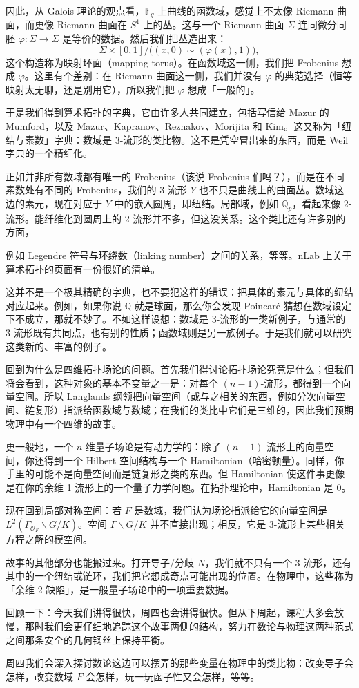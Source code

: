 因此，从 Galois 理论的观点看，$\mathbb{F}_q$ 上曲线的函数域，感觉上不太像 Riemann 曲面，而更像 Riemann 曲面在 $S^1$ 上的丛。这与一个 Riemann 曲面 $\Sigma$ 连同微分同胚 $\varphi:\Sigma\to\Sigma$ 是等价的数据。然后我们把丛造出来：
\[
\Sigma\times[0,1]\big/\big((x,0)\sim(\varphi(x),1)\big),
\]
这个构造称为映射环面（mapping torus）。在函数域这一侧，我们把 Frobenius 想成 $\varphi$。这里有个差别：在 Riemann 曲面这一侧，我们并没有 $\varphi$ 的典范选择（恒等映射太无聊，还是别用它），所以我们把 $\varphi$ 想成「一般的」。

于是我们得到算术拓扑的字典，它由许多人共同建立，包括写信给 Mazur 的 Mumford，以及 Mazur、Kapranov、Reznakov、Morijita 和 Kim。这又称为「纽结与素数」字典：数域是 3-流形的类比物。这不是凭空冒出来的东西，而是 Weil 字典的一个精细化。

正如并非所有数域都有唯一的 Frobenius（该说 Frobenius 们吗？），而是在不同素数处有不同的 Frobenius，我们的 3-流形 $Y$ 也不只是曲线上的曲面丛。数域这边的素元，现在对应于 $Y$ 中的嵌入圆周，即纽结。局部域，例如 $\mathbb{Q}_p$，看起来像 2-流形。能纤维化到圆周上的 2-流形并不多，但这没关系。这个类比还有许多别的方面，


例如 Legendre 符号与环绕数（linking number）之间的关系，等等。nLab 上关于算术拓扑的页面有一份很好的清单。

这并不是一个极其精确的字典，也不要犯这样的错误：把具体的素元与具体的纽结对应起来。例如，如果你说 $\mathbb{Q}$ 就是球面，那么你会发现 Poincaré 猜想在数域设定下不成立，那就不妙了。不如这样设想：数域是 3-流形的一类新例子，与通常的 3-流形既有共同点，也有别的性质；函数域则是另一族例子。于是我们就可以研究这类新的、丰富的例子。

回到为什么是四维拓扑场论的问题。首先我们得讨论拓扑场论究竟是什么；但我们将会看到，这种对象的基本不变量之一是：对每个 $(n-1)$-流形，都得到一个向量空间。所以 Langlands 纲领把向量空间（或与之相关的东西，例如分次向量空间、链复形）指派给函数域与数域；在我们的类比中它们是三维的，因此我们预期物理中有一个四维的故事。

更一般地，一个 $n$ 维量子场论是有动力学的：除了 $(n-1)$-流形上的向量空间，你还得到一个 Hilbert 空间结构与一个 Hamiltonian（哈密顿量）。同样，你手里的可能不是向量空间而是链复形之类的东西。但 Hamiltonian 使这件事更像是在你的余维 1 流形上的一个量子力学问题。在拓扑理论中，Hamiltonian 是 $0$。

现在回到局部对称空间：若 $F$ 是数域，我们认为场论指派给它的向量空间是 $L^2(\Gamma_{\mathcal{O}_F}\backslash G/K)$。空间 $\Gamma\backslash G/K$ 并不直接出现；相反，它是 3-流形上某些相关方程之解的模空间。

故事的其他部分也能搬过来。打开导子/分歧 $N$，我们就不只有一个 3-流形，还有其中的一个纽结或链环，我们把它想成奇点可能出现的位置。在物理中，这些称为「余维 2 缺陷」，是一般量子场论中的一项重要数据。

回顾一下：今天我们讲得很快，周四也会讲得很快。但从下周起，课程大多会放慢，那时我们会更仔细地追踪这个故事两侧的结构，努力在数论与物理这两种范式之间那条安全的几何钢丝上保持平衡。

周四我们会深入探讨数论这边可以摆弄的那些变量在物理中的类比物：改变导子会怎样，改变数域 $F$ 会怎样，玩一玩函子性又会怎样，等等。
